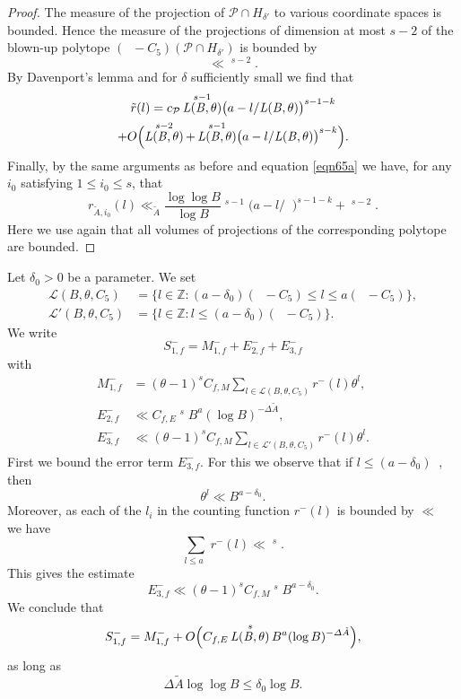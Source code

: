 \documentclass[JEP,XML,SOM,Unicode,published]{cedram}
\DeclareMathOperator{\LBt}{\mathit{L(B,\theta)}}
\newcommand{\cLBtpC}{\calL(B,\theta,C_5)}
\newcommand{\cLBtm}{\calL'(B,\theta,C_5)}
\let\del\delta
\let\vardel\varDelta
\let\tet\theta
\newcommand{\calL}{\mathcal{L}}
\newcommand{\calP}{\mathcal{P}}
\newcommand\ZZ{\mathbb{Z}}
\theoremstyle{definition}
\numberwithin{theorem}{section}
\begin{document}
\begin{proof}
The measure of the projection of $\calP\cap H_{\del'}$ to various coordinate spaces is bounded. Hence the measure of the projections of dimension at most $s-2$ of the blown-up polytope $\left(\LBt -C_5\right)(\calP\cap H_{\del'})$ is bounded by\vspace*{-3pt}
\[
\ll \LBt^{s-2}.
\]
By Davenport's lemma \cite{davenport} and for $\del$ sufficiently small we find that
\begin{multline*}
\tilde{r}(l)=c_{\calP} \LBt^{s-1} \bigl(a- l/{\LBt}\bigr)^{s-1-k} \\
+O\Bigl(\LBt^{s-2}+ \LBt^{s-1} \bigl(a- l/{\LBt}\bigr)^{s-k} \Bigr).
\end{multline*}
Finally, by the same arguments as before and equation \eqref{eqn65a} we have, for any $i_0$ satis\-fying $1\leq i_0\leq s$, that\vspace*{-3pt}
\[
r_{\tilde{A},i_0}(l) \ll_{\tilde{A}} \frac{\log \log B}{\log B}\LBt^{s-1} \bigl(a- l/{\LBt}\bigr)^{s-1-k}+\LBt^{s-2}.
\]
Here we use again that all volumes of projections of the corresponding polytope are bounded.
\end{proof}

Let $\del_0>0$ be a parameter. We set
\begin{align*}
\cLBtpC&=\{l\in\ZZ:(a-\del_0)(\LBt -C_5) \leq l\leq a (\LBt - C_5)\},\\
\cLBtm&=\{l\in\ZZ:l\leq(a-\del_0)(\LBt -C_5)\}.
\end{align*}
We write
\[
S_{1,f}^- = M_{1,f}^-+ E_{2,f}^- + E_{3,f}^-
\]
with
\begin{align*}
M_{1,f}^-&= (\tet -1)^s C_{f,M} \sum_{l\in\cLBtpC} r^-(l) \tet^l,
\\
E_{2,f}^-&\ll C_{f,E} \LBt^s B^{a} (\log B)^{-\vardel \tilde{A}},\\
E_{3,f}^- &\ll (\tet -1)^s C_{f,M} \sum_{l\in\cLBtm} r^-(l) \tet^l.
\end{align*}
First we bound the error term $E_{3,f}^-$. For this we observe that if $l\leq (a-\del_0) \LBt$, then
\[
\tet^l \ll B^{a-\del_0}.
\]
Moreover, as each of the $l_i$ in the counting function $r^-(l)$ is bounded by $\ll \LBt$ we have
\[
\sum_{l\leq a \LBt} r^-(l) \ll \LBt^s.
\]
This gives the estimate
\[
E_{3,f}^-\ll (\tet -1)^s C_{f,M} \LBt^{s} B^{a-\del_0}.
\]
We conclude that
\[
S_{1,f}^-= M_{1,f}^- + O\Bigl(C_{f,E} \LBt^s B^{a} (\log B)^{-\vardel \tilde{A}}\Bigr),
\]
as long as
\begin{equation}\label{eqndelkap}
\Delta \tilde{A} \log \log B \leq \del_0 \log B.
\end{equation}
\end{document}
